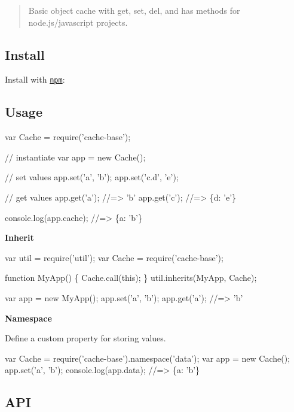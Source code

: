 \begin{quote}
Basic object cache with {\ttfamily get}, {\ttfamily set}, {\ttfamily del}, and {\ttfamily has} methods for node.\+js/javascript projects. \end{quote}


\subsection*{Install}

Install with \href{https://www.npmjs.com/}{\tt npm}\+:




\subsection*{Usage}


\begin{DoxyCode}
var Cache = require('cache-base');

// instantiate
var app = new Cache();

// set values
app.set('a', 'b');
app.set('c.d', 'e');

// get values
app.get('a');
//=> 'b'
app.get('c');
//=> \{d: 'e'\}

console.log(app.cache);
//=> \{a: 'b'\}
\end{DoxyCode}


{\bfseries Inherit}


\begin{DoxyCode}
var util = require('util');
var Cache = require('cache-base');

function MyApp() \{
  Cache.call(this);
\}
util.inherits(MyApp, Cache);

var app = new MyApp();
app.set('a', 'b');
app.get('a');
//=> 'b'
\end{DoxyCode}


{\bfseries Namespace}

Define a custom property for storing values.


\begin{DoxyCode}
var Cache = require('cache-base').namespace('data');
var app = new Cache();
app.set('a', 'b');
console.log(app.data);
//=> \{a: 'b'\}
\end{DoxyCode}


\subsection*{A\+PI}

